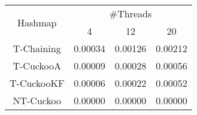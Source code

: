 \begin{tabular}{|c|c|c|c|}
\hline
\multirow{2}{*}{Hashmap} & \multicolumn{3}{c|}{\#Threads}\\\cline{2-4}& 4 & 12 & 20\\
\hline
\hline
T-Chaining & 0.00034 & 0.00126 & 0.00212\\
T-CuckooA & 0.00009 & 0.00028 & 0.00056\\
T-CuckooKF & 0.00006 & 0.00022 & 0.00052\\
NT-Cuckoo & 0.00000 & 0.00000 & 0.00000\\
\hline
\end{tabular}
